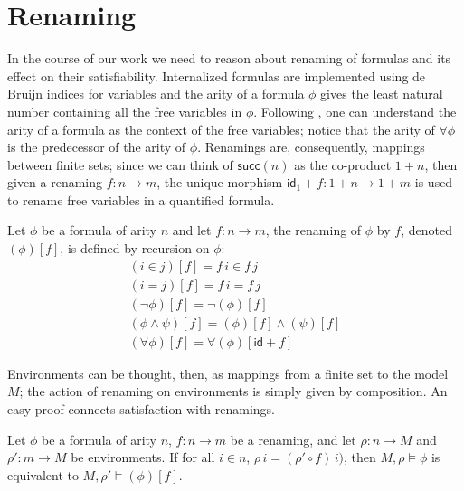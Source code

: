 \section{Renaming}
\label{sec:renaming}
\newcommand{\renaming}[2]{(#1)[#2]}
\newcommand{\inFm}[2]{#1 \in #2}
\newcommand{\eqFm}[2]{#1 = #2}
\newcommand{\negFm}[1]{\neg #1}
\newcommand{\andFm}[2]{#1 \wedge #2}
\newcommand{\forallFm}[1]{\forall #1}

\newcommand{\inIFm}[2]{\mathsf{Member}(#1,#2)}
\newcommand{\eqIFm}[2]{\mathsf{Equal}(#1,#2)}
\newcommand{\nandIFm}[2]{\mathsf{Nand}(#1,#2)}
\newcommand{\forallIFm}[1]{\mathsf{Forall(#1)}}


In the course of our work we need to reason about renaming of formulas
and its effect on their satisfiability. Internalized formulas are
implemented using de Bruijn indices for variables and the arity of a
formula $\phi$ gives the least natural number containing all the free
variables in $\phi$. Following \citet{fiore-abssyn}, one can
understand the arity of a formula as the context of the free
variables; notice that the arity of $\forallFm{\phi}$ is the
predecessor of the arity of $\phi$. Renamings are, consequently,
mappings between finite sets; since we can think of $\mathsf{succ}(n)$
as the co-product $1+n$, then given a renaming $f \colon n \to m$, the
unique morphism $\mathsf{id}_1+f \colon 1+n \to 1+m$ is used to rename
free variables in a quantified formula.

\begin{definition}[Renaming]
  Let $\phi$ be a formula of arity $n$ and let $f \colon n \to m$, the
  renaming of $\phi$ by $f$, denoted $\renaming{\phi}{f}$, is defined
  by recursion on $\phi$:
  \begin{gather*}
    \renaming{\inFm{i}{j}}{f} = \inFm{f\,i}{f\,j}\\
    \renaming{\eqFm{i}{j}}{f} = \eqFm{f\,i}{f\,j}\\
    \renaming{\negFm{\phi}}{f} = \negFm{\renaming{\phi}{f}}\\
    \renaming{\andFm{\phi}{\psi}}{f} = \andFm{\renaming{\phi}{f}}{\renaming{\psi}{f}}\\
    \renaming{\forallFm{\phi}}{f} = \forallFm{\renaming{\phi}{\mathsf{id}+f}}
  \end{gather*}
\end{definition}

Environments can be thought, then, as mappings from a finite set to
the model $M$; the action of renaming on environments is simply given
by composition. An easy proof connects satisfaction with renamings.
\begin{lemma}
  \label{lem:renaming}
  Let $\phi$ be a formula of arity $n$, $f \colon n \to m$ be a
  renaming, and let $\rho \colon n \to M$ and $\rho' \colon m \to M$
  be environments. If for all $i \in n$,
  $\rho\,i = (\rho' \circ f)\,i)$, then $M,\rho\models \phi$ is
  equivalent to $M,\rho' \models \renaming{\phi}{f}$.
\end{lemma}

